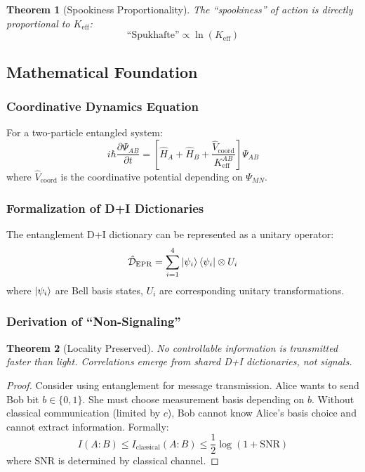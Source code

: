 \documentclass[11pt,a4paper]{article}
\newtheorem{theorem}{Theorem}
\begin{document}
	\begin{theorem}[Spookiness Proportionality]
		The ``spookiness'' of action is directly proportional to $K_{\mathrm{eff}}$:
		\begin{equation}
			\text{``Spukhafte''} \propto \ln(K_{\mathrm{eff}})
		\end{equation}
	\end{theorem}
	
	\subsection{Mathematical Foundation}
	\label{subsec:math-foundation}
	
	\subsubsection{Coordinative Dynamics Equation}
	For a two-particle entangled system:
	\begin{equation}
		i\hbar \frac{\partial \Psi_{AB}}{\partial t} = \left[ \hat{H}_A + \hat{H}_B + \frac{\hat{V}_{\text{coord}}}{K_{\mathrm{eff}}^{AB}} \right] \Psi_{AB}
	\end{equation}
	where $\hat{V}_{\text{coord}}$ is the coordinative potential depending on $\Psi_{MN}$.
	
	\subsubsection{Formalization of D+I Dictionaries}
	The entanglement D+I dictionary can be represented as a unitary operator:
	\begin{equation}
		\hat{\mathcal{D}}_{\text{EPR}} = \sum_{i=1}^{4} \ket{\psi_i}\bra{\psi_i} \otimes U_i
	\end{equation}
	where $\ket{\psi_i}$ are Bell basis states, $U_i$ are corresponding unitary transformations.
	
	\subsubsection{Derivation of ``Non-Signaling''}
	\begin{theorem}[Locality Preserved]
		No controllable information is transmitted faster than light. Correlations emerge from shared D+I dictionaries, not signals.
	\end{theorem}
	
	\begin{proof}
		Consider using entanglement for message transmission. Alice wants to send Bob bit $b \in \{0,1\}$. She must choose measurement basis depending on $b$. Without classical communication (limited by $c$), Bob cannot know Alice's basis choice and cannot extract information. Formally:
		\begin{equation}
			I(A:B) \leq I_{\text{classical}}(A:B) \leq \frac{1}{2} \log(1 + \text{SNR})
		\end{equation}
		where SNR is determined by classical channel.
	\end{proof}
	
\end{document}

